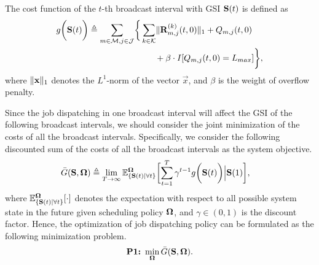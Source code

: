 \begin{definition}
    The cost function of the $t$-th broadcast interval with GSI $\mathbf{S}(t)$ is defined as
    {\small
    \begin{align}
        g\Paren{\Stat(t)} \define
            \sum_{m\in\esSet,j\in\jSpace}
            \Brace{&
                \sum_{k\in\apSet} \Inorm{\vec{R}^{(k)}_{m,j}(t,0)} + Q_{m,j}(t,0)
                \nonumber\\
                &~~~~~+ \beta \cdot I[Q_{m,j}(t,0)=L_{max}]
            },
    \end{align}
    }
    where $\lVert\mathbf{x}\|_1$ denotes the $L^1$-norm of the vector $\vec{x}$, and $\beta$ is the weight of overflow penalty.
\end{definition}

Since the job dispatching in one broadcast interval will affect the GSI of the following broadcast intervals, we should consider the joint minimization of the costs of all the broadcast intervals.
Specifically, we consider the following discounted sum of the costs of all the broadcast intervals as the system objective.
\begin{align}
    &\bar{G}(\Stat, \Policy) \define
    \lim_{T \to \infty} \mathbb{E}^{\Policy}_{\set{\Stat(t)|\forall t}}
    \Bracket{
        \sum_{t=1}^{T} \gamma^{t-1} g\Paren{\Stat(t)} \Big| \Stat(1)
    },
\end{align}
where $\mathbb{E}^{\boldsymbol{\Omega}}_{\{\mathbf{S}(t)|\forall t\}}[\cdot]$ denotes the expectation with respect to all possible system state in the future given scheduling policy $\boldsymbol{\Omega}$, and $\gamma \in (0,1)$ is the discount factor.
Hence, the optimization of job dispatching policy can be formulated as the following minimization problem.
\begin{align}
    \textbf{P1:}~
    \min_{\boldsymbol{\Omega}} \bar{G}(\mathbf{S}, \boldsymbol{\Omega}).
\end{align}

